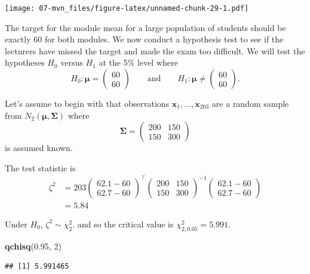 \documentclass[]{book}
\newenvironment{Shaded}{\begin{snugshade}}{\end{snugshade}}
\newcommand{\DecValTok}[1]{\textcolor[rgb]{0.00,0.00,0.81}{#1}}
\newcommand{\FloatTok}[1]{\textcolor[rgb]{0.00,0.00,0.81}{#1}}
\newcommand{\KeywordTok}[1]{\textcolor[rgb]{0.13,0.29,0.53}{\textbf{#1}}}
\newcommand{\NormalTok}[1]{#1}
\theoremstyle{definition}
\theoremstyle{definition}
\theoremstyle{definition}
\theoremstyle{remark}
\begin{document}
\texttt{[image: 07-mvn\_files/figure-latex/unnamed-chunk-29-1.pdf]}

The target for the module mean for a large population of students should be exactly 60 for both modules. We now conduct a hypothesis test to see if the lecturers have missed the target and made the exam too difficult. We will test the hypotheses \(H_0\) versus \(H_1\) at the 5\% level where
\[
H_0: {\boldsymbol{\mu}}= \begin{pmatrix} 60 \\ 60 \end{pmatrix} \qquad \text{and} \qquad H_1: {\boldsymbol{\mu}}\neq \begin{pmatrix} 60 \\ 60 \end{pmatrix}.
\]

Let's assume to begin with that observations \(\mathbf x_1,\ldots,\mathbf x_{203}\) are a random sample from \(N_2({\boldsymbol{\mu}},\boldsymbol{\Sigma})\) where
\[
\boldsymbol{\Sigma}= \begin{pmatrix} 200 & 150 \\ 150 & 300 \end{pmatrix}
\]
is assumed known.

The test statistic is
\begin{align*}
\zeta^2 &= 203 \begin{pmatrix} 62.1 - 60 \\ 62.7 - 60 \end{pmatrix}^\top \begin{pmatrix} 200 & 150 \\ 150 & 300 \end{pmatrix}^{-1} \begin{pmatrix} 62.1 - 60 \\ 62.7 - 60 \end{pmatrix}\\
&=5.84
\end{align*}

Under \(H_0\), \(\zeta^2\sim \chi^2_2\). and so the critical value is \(\chi^2_{2,0.05} = 5.991\).

\begin{Shaded}
\begin{Highlighting}[]
\KeywordTok{qchisq}\NormalTok{(}\FloatTok{0.95}\NormalTok{, }\DecValTok{2}\NormalTok{)}
\end{Highlighting}
\end{Shaded}

\begin{verbatim}
## [1] 5.991465
\end{verbatim}
\end{document}
